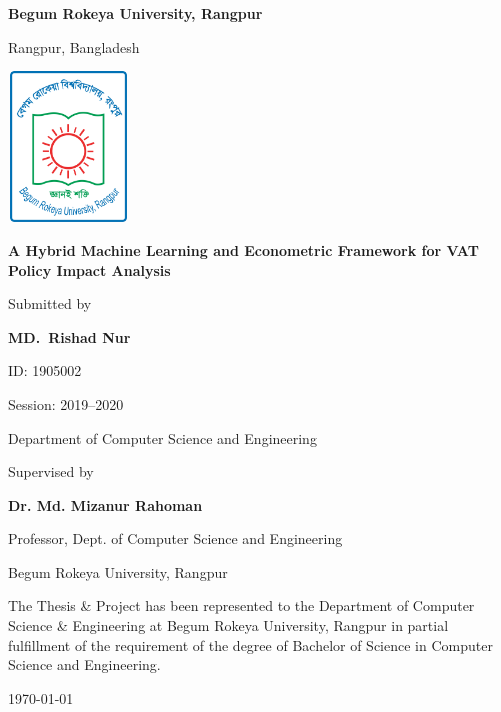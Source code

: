 \begin{titlepage}
    \centering
    
    {\LARGE\bfseries Begum Rokeya University, Rangpur\par}
    {\large Rangpur, Bangladesh\par}
    
    \vspace{1cm}
    
    \includegraphics[width=3.2cm,height=4cm]{images/BRUR_Logo.png}
    
    \vspace{1cm}
    
    {\LARGE\bfseries A Hybrid Machine Learning and Econometric Framework for VAT Policy Impact Analysis\par}
    

    \vspace{2cm}
    
    Submitted by\par
    \textbf{MD.\ Rishad Nur}\par
    ID: 1905002\par
    Session: 2019--2020\par
    Department of Computer Science and Engineering\par

    \vspace{1cm}

    Supervised by\par
    \textbf{Dr. Md. Mizanur Rahoman}\par
    Professor, Dept. of Computer Science and Engineering\par
    Begum Rokeya University, Rangpur\par

    \vspace{1cm}
    
    {\small
    \begin{flushleft}
    The Thesis \& Project has been represented to the Department of Computer Science \& Engineering at Begum Rokeya University, Rangpur in partial fulfillment of the requirement of the degree of Bachelor of Science in Computer Science and Engineering.
    \end{flushleft}
    }

    \vspace{1cm}

    {\large \today\par}
\end{titlepage}

